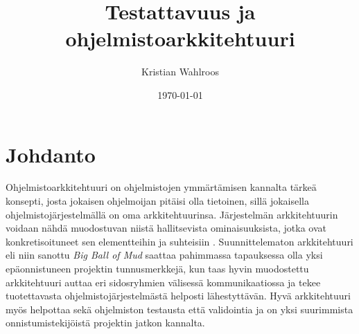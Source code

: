 \documentclass[finnish]{tktltiki2}
\title{Testattavuus ja ohjelmistoarkkitehtuuri}
\author{Kristian Wahlroos}
\date{\today}
\numberwithin{table}{section}
\theoremstyle{definition}
\theoremstyle{remark}
\begin{document}
\renewcommand*{\harvardand}{\&}

\frontmatter      %

\maketitle        %
\makeabstract     %

\tableofcontents  %


\mainmatter       %

\section{Johdanto}









Ohjelmistoarkkitehtuuri on ohjelmistojen ymmärtämisen kannalta tärkeä konsepti, josta jokaisen ohjelmoijan pitäisi olla tietoinen, sillä jokaisella ohjelmistojärjestelmällä on oma arkkitehtuurinsa. Järjestelmän arkkitehtuurin voidaan nähdä muodostuvan niistä hallitsevista ominaisuuksista, jotka ovat konkretisoituneet sen elementteihin ja suhteisiin \citep[s. 2]{ISOIEEE42010}. Suunnittelematon arkkitehtuuri eli niin sanottu \textit{Big Ball of Mud} saattaa pahimmassa tapauksessa olla yksi epäonnistuneen projektin tunnusmerkkejä, kun taas hyvin muodostettu arkkitehtuuri auttaa eri sidosryhmien välisessä kommunikaatiossa ja tekee tuotettavasta ohjelmistojärjestelmästä helposti lähestyttävän. Hyvä arkkitehtuuri myös helpottaa sekä ohjelmiston testausta että validointia ja on yksi suurimmista onnistumistekijöistä projektin jatkon kannalta. 
\end{document}
